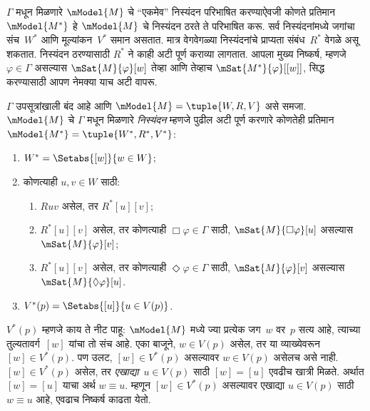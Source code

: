 $\Gamma$ मधून मिळणारे $\mModel{M}$ चे “एकमेव” निस्यंदन
परिभाषित करण्याऐवजी कोणते प्रतिमान~$\mModel{M^*}$ हे
$\mModel{M}$ चे निस्यंदन ठरते ते परिभाषित करू.
सर्व निस्यंदनांमध्ये जगांचा संच~$W^*$ आणि मूल्यांकन~$V^*$
समान असतात. मात्र वेगवेगळ्या निस्यंदनांचे प्राप्यता
संबंध~$R^*$ वेगळे असू शकतात. निस्यंदन ठरण्यासाठी
$R^*$ ने काही अटी पूर्ण कराव्या लागतात. आपला मुख्य
निष्कर्ष, म्हणजे $\varphi \in \Gamma$ असल्यास
$\mSat{M}{\varphi}[w]$ तेव्हा आणि तेव्हाच
$\mSat{M^*}{\varphi}[{[w]}]$, सिद्ध करण्यासाठी
आपण नेमक्या याच अटी वापरू.

\begin{defn}\label{nml:fil:fil:defn:filtration}
  $\Gamma$ उपसूत्रांखाली बंद आहे आणि
  $\mModel{M} = \tuple{W, R, V}$ असे समजा.
  $\mModel{M}$ चे $\Gamma$ मधून मिळणारे
  \emph{निस्यंदन} म्हणजे पुढील अटी पूर्ण करणारे
  कोणतेही प्रतिमान $\mModel{M^*} = \tuple{W^*,R^*,V^*}$:
  \begin{enumerate}
  \item $W^* = \Setabs{[w]}{w \in W}$;
  \item \label{nml:fil:fil:defn:filtration-R}
    कोणत्याही $u,v \in W$ साठी:
    \begin{enumerate}
    \item \label{nml:fil:fil:defn:filtration-R1}
      $Ruv$ असेल, तर $R^*[u][v]$;
    \item \label{nml:fil:fil:defn:filtration-R2}
      $R^*[u][v]$ असेल, तर कोणत्याही $\Box \varphi \in \Gamma$ साठी,
      $\mSat{M}{\Box\varphi}[u]$ असल्यास $\mSat{M}{\varphi}[v]$;
    \item \label{nml:fil:fil:defn:filtration-R3}
      $R^*[u][v]$ असेल, तर कोणत्याही $\Diamond \varphi \in \Gamma$ साठी,
      $\mSat{M}{\varphi}[v]$ असल्यास $\mSat{M}{\Diamond\varphi}[u]$.
    \end{enumerate}
  \item $V^*(p) = \Setabs{[u]}{u \in V(p)}$.
  \end{enumerate}
\end{defn}

$V^*(p)$ म्हणजे काय ते नीट पाहू: $\mModel{M}$ मध्ये
ज्या प्रत्येक जग~$w$ वर~$p$ सत्य आहे, त्याच्या
तुल्यतावर्ग~$[w]$ यांचा तो संच आहे. एका बाजूने,
$w \in V(p)$ असेल, तर
या व्याख्येवरून $[w] \in V^*(p)$. पण उलट,
$[w] \in V^*(p)$ असल्यावर $w \in V(p)$ असेलच असे नाही.
$[w] \in V^*(p)$ असेल, तर \emph{एखाद्या}~$u \in V(p)$
साठी $[w] = [u]$ एवढीच खात्री मिळते. अर्थात
$[w] = [u]$ याचा अर्थ $w \equiv u$. म्हणून
$[w] \in V^*(p)$ असल्यावर एखाद्या $u \in V(p)$
साठी $w \equiv u$ आहे, एवढाच निष्कर्ष काढता येतो.

